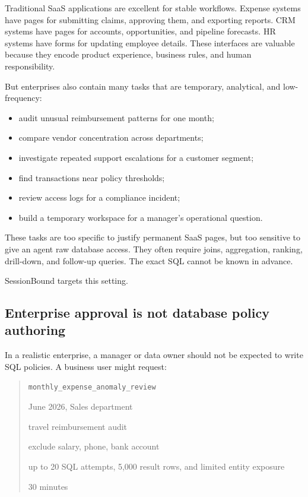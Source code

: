 \documentclass[
]{article}
\providecommand{\tightlist}{%
  \setlength{\itemsep}{0pt}\setlength{\parskip}{0pt}}
\begin{document}
Traditional SaaS applications are excellent for stable workflows.
Expense systems have pages for submitting claims, approving them, and
exporting reports. CRM systems have pages for accounts, opportunities,
and pipeline forecasts. HR systems have forms for updating employee
details. These interfaces are valuable because they encode product
experience, business rules, and human responsibility.

But enterprises also contain many tasks that are temporary, analytical,
and low-frequency:

\begin{itemize}
\tightlist
\item
  audit unusual reimbursement patterns for one month;
\item
  compare vendor concentration across departments;
\item
  investigate repeated support escalations for a customer segment;
\item
  find transactions near policy thresholds;
\item
  review access logs for a compliance incident;
\item
  build a temporary workspace for a manager's operational question.
\end{itemize}

These tasks are too specific to justify permanent SaaS pages, but too
sensitive to give an agent raw database access. They often require
joins, aggregation, ranking, drill-down, and follow-up queries. The
exact SQL cannot be known in advance.

SessionBound targets this setting.

\hypertarget{enterprise-approval-is-not-database-policy-authoring}{%
\subsection{Enterprise approval is not database policy
authoring}\label{enterprise-approval-is-not-database-policy-authoring}}

In a realistic enterprise, a manager or data owner should not be
expected to write SQL policies. A business user might request:

\begin{quote}
\begin{description}
\tightlist
\item[Task type:]
\texttt{monthly\_expense\_anomaly\_review}
\item[Scope:]
June 2026, Sales department
\item[Purpose:]
travel reimbursement audit
\item[Sensitivity:]
exclude salary, phone, bank account
\item[Budget:]
up to 20 SQL attempts, 5,000 result rows, and limited entity exposure
\item[TTL:]
30 minutes
\end{description}
\end{quote}
\end{document}
